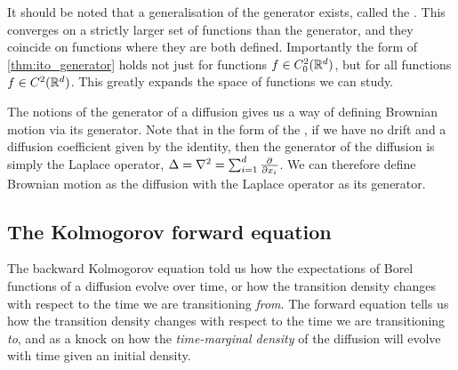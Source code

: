 It should be noted that a generalisation of the generator exists, called the  \parencite[section 7.5]{oksendal2003stochastic}.
This converges on a strictly larger set of functions than the generator, and they coincide on functions where they are both defined.
Importantly the form of \cref{thm:ito_generator} holds not just for functions \(f\in C_0^2(\mathbb{R}^d)\), but for all functions \(f\in C^2(\mathbb{R}^d)\).
This greatly expands the space of functions we can study.

The notions of the generator of a diffusion gives us a way of defining Brownian motion via its generator.
Note that in the form of the , if we have no drift and a diffusion coefficient given by the identity, then the generator of the diffusion is simply the Laplace operator, \(\Delta = \nabla^2 = \sum_{i=1}^d \pd{}{x_i}\).
We can therefore define Brownian motion as the diffusion with the Laplace operator as its generator.


\subsection{The Kolmogorov forward equation}
The backward Kolmogorov equation told us how the expectations of Borel functions of a diffusion evolve over time, or how the transition density changes with respect to the time we are transitioning \emph{from}. 
The forward equation tells us how the transition density changes with respect to the time we are transitioning \emph{to}, and as a knock on how the \emph{time-marginal density} of the diffusion will evolve with time given an initial density. 



